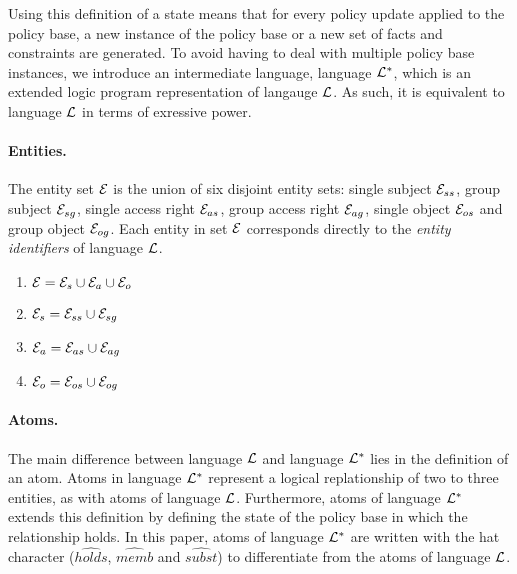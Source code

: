 \documentclass[10pt, twocolumn]{article}
\begin{document}
        Using this definition of a state means that for every policy update
        applied to the policy base, a new instance of the policy base or a new
        set of facts and constraints are generated. To avoid having to deal
        with multiple policy base instances, we introduce an intermediate
        language, language ${\cal L}^{*}$, which is an extended logic program
        representation of langauge ${\cal L}$. As such, it is equivalent to
        language ${\cal L}$ in terms of exressive power.

        \paragraph{Entities.}

          The entity set ${\cal E}$ is the union of six disjoint entity sets:
          single subject ${\cal E}_{ss}$, group subject ${\cal E}_{sg}$,
          single access right ${\cal E}_{as}$, group access right
          ${\cal E}_{ag}$, single object ${\cal E}_{os}$ and group object
          ${\cal E}_{og}$. Each entity in set ${\cal E}$ corresponds directly
          to the \emph{entity identifiers} of language ${\cal L}$.

          \begin{enumerate}
            \item
              ${\cal E} = {\cal E}_{s} \cup {\cal E}_{a} \cup {\cal E}_{o}$
            \item
              ${\cal E}_{s} = {\cal E}_{ss} \cup {\cal E}_{sg}$
            \item
              ${\cal E}_{a} = {\cal E}_{as} \cup {\cal E}_{ag}$
            \item
              ${\cal E}_{o} = {\cal E}_{os} \cup {\cal E}_{og}$
          \end{enumerate}

        \paragraph{Atoms.}

          The main difference between language ${\cal L}$ and language
          ${\cal L}^{*}$ lies in the definition of an atom. Atoms in language
          ${\cal L}^{*}$ represent a logical replationship of two to three
          entities, as with atoms of language ${\cal L}$. Furthermore, atoms of
          language ${\cal L}^{*}$ extends this definition by defining the
          state of the policy base in which the relationship holds. In this
          paper, atoms of language ${\cal L}^{*}$ are written with the
          hat character ($\hat{holds}$, $\hat{memb}$ and $\hat{subst}$) to
          differentiate from the atoms of language ${\cal L}$.
\end{document}
